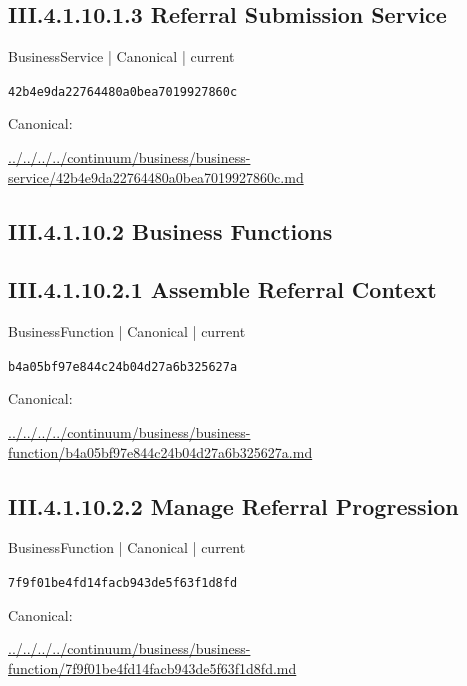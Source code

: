\documentclass[10pt,a4paper]{article}
\begin{document}
\subsection*{III.4.1.10.1.3 Referral Submission Service}
\label{element-42b4e9da22764480a0bea7019927860c}
{\small BusinessService | Canonical | current}\par
\texttt{42b4e9da22764480a0bea7019927860c}\par
Canonical: \par
{\footnotesize\url{../../../../continuum/business/business-service/42b4e9da22764480a0bea7019927860c.md}}\par
\subsection*{III.4.1.10.2 Business Functions}
\subsection*{III.4.1.10.2.1 Assemble Referral Context}
\label{element-b4a05bf97e844c24b04d27a6b325627a}
{\small BusinessFunction | Canonical | current}\par
\texttt{b4a05bf97e844c24b04d27a6b325627a}\par
Canonical: \par
{\footnotesize\url{../../../../continuum/business/business-function/b4a05bf97e844c24b04d27a6b325627a.md}}\par
\subsection*{III.4.1.10.2.2 Manage Referral Progression}
\label{element-7f9f01be4fd14facb943de5f63f1d8fd}
{\small BusinessFunction | Canonical | current}\par
\texttt{7f9f01be4fd14facb943de5f63f1d8fd}\par
Canonical: \par
{\footnotesize\url{../../../../continuum/business/business-function/7f9f01be4fd14facb943de5f63f1d8fd.md}}\par
\end{document}
